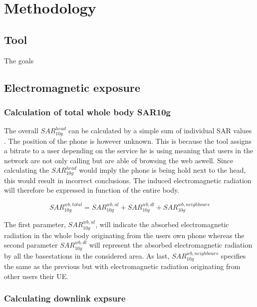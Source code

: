 \chapter{Methodology}
\label{chap:methodology}


\section{Tool}
The goals 
\section{Electromagnetic exposure}
\subsection{Calculation of total whole body SAR10g} %
\label{sub:Calculationexposure}

The overall $SAR^{head}_{10g}$ can be calculated by a simple sum of individual SAR values \cite{J17_kuehn2019modelling}. 
The position of the phone is however unknown. This is because the tool assigns a bitrate to a user depending on the service he is using
meaning that users in the network are not only calling but are able of browsing the web aswell. 
Since calculating the $SAR^{head}_{10g}$ would imply the phone is being hold next to the head, this would result in incorrect conclusions.
The induced electromagnetic radiation will therefore be expressed in function of the entire body.


\begin{equation} 
SAR^{wb,total}_{10g} = SAR^{wb,ul}_{10g} +  SAR^{wb,dl}_{10g} + SAR^{wb,neighbours}_{10g}
\label{eq:overallSARwb}
\end{equation}

The first parameter, $SAR^{wb,ul}_{10g}$, will indicate the absorbed electromagnetic radiation in the whole body originating from the users own phone
whereas the second parameter $SAR^{wb,dl}_{10g}$ will represent the absorbed electromagnetic radiation by all the basestations in the considered area.
As last, $SAR^{wb,neighbours}_{10g} $ specifies the same as the previous but with electromagnetic radiation originating from other users their \gls{UE}.

\subsection{Calculating downlink expsure} %
\label{sub:Calculating downlink expsure}

